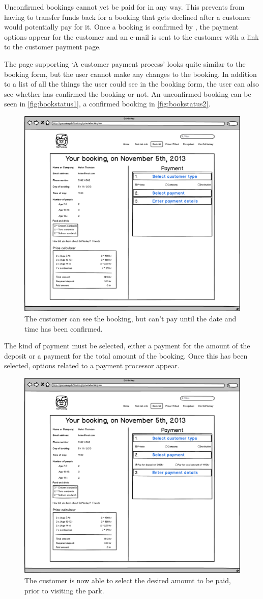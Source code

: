 \FloatBarrier
\newpage

Unconfirmed bookings cannot yet be paid for in any way. This prevents
\gomonkey{} from having to transfer funds back for a booking that gets declined
after a customer would potentially pay for it. Once a booking is confirmed by
\gomonkey{}, the payment options appear for the customer and an e-mail is sent
to the customer with a link to the customer payment page.

The page supporting `A customer payment process' looks quite similar to the
booking form, but the user cannot make any changes to the booking. In addition
to a list of all the things the user could see in the booking form, the user can
also see whether \gomonkey{} has confirmed the booking or not. An unconfirmed
booking can be seen in \autoref{fig:bookstatus1}, a confirmed booking in
\autoref{fig:bookstatus2}.

\begin{figure}[htbp]
    \centering
        \includegraphics[width=.6\textwidth]{figures/mockup/booking_payment_1.png}
	    \caption{The customer can see the booking, but can't pay until the date and time has been confirmed.}
        \label{fig:bookstatus1}
\end{figure}

The kind of payment must be selected, either a payment for the amount of the
deposit or a payment for the total amount of the booking. Once this has been
selected, options related to a payment processor appear.


\begin{figure}[htbp]
    \centering
        \includegraphics[width=.6\textwidth]{figures/mockup/booking_payment_2.png}
	    \caption{The customer is now able to select the desired amount to be paid, prior to visiting the park.}
        \label{fig:bookstatus2}
\end{figure}

